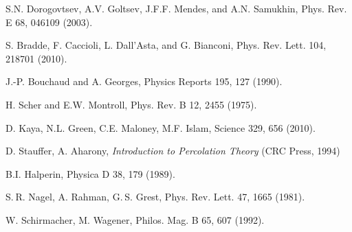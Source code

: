 \documentclass[aps,pre,floats,floatfix,twocolumn]{revtex4}
\newcommand{\rmrk}[1]{#1}
\begin{document}
\begin{thebibliography}{99}



\rmrk{S.N. Dorogovtsev, A.V. Goltsev, J.F.F. Mendes, and A.N. Samukhin,}
Phys. Rev. E 68, 046109 (2003).


\rmrk{S. Bradde, F. Caccioli, L. Dall’Asta, and G. Bianconi,} 
Phys. Rev. Lett. 104, 218701 (2010).




\rmrk{J.-P. Bouchaud and A. Georges,} 
Physics Reports 195, 127 (1990).

\rmrk{H. Scher and E.W. Montroll,} 
Phys. Rev. B 12, 2455 (1975).

\rmrk{D. Kaya, N.L. Green, C.E. Maloney,  M.F. Islam,}
Science 329, 656 (2010).




D. Stauffer, A. Aharony, 
{\em Introduction to Percolation Theory}
(CRC Press, 1994) 



B.I. Halperin, Physica D 38,  179 (1989).




S. R. Nagel, A. Rahman, G. S. Grest, 
Phys. Rev. Lett. 47, 1665 (1981).

W. Schirmacher, M. Wagener, 
Philos. Mag. B 65, 607 (1992).



\end{thebibliography}
\end{document}
